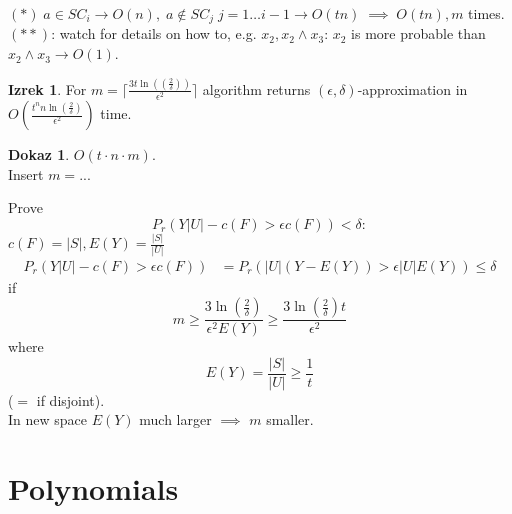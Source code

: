 \documentclass[a4paper, 12pt]{book}
\theoremstyle{definition}
\newtheorem{theorem}[counter]{Izrek}
\newtheorem{pro}[counter]{Dokaz}
\theoremstyle{remark}
\begin{document}
$(*) \; a \in SC_i \to O(n), \; a \notin SC_j \; j = 1 \dots i-1 \to O(tn) \; \implies \; O(tn), m$ times. \\
$(**)$: watch for details on how to, e.g. $x_2, x_2 \land x_3$: $x_2$ is more probable than $x_2 \land x_3 \to O(1)$.
\begin{theorem}
  For $m = \lceil\frac{3t \ln(\left(\frac{2}{\delta}\right))}{\epsilon^2}\rceil$ algorithm returns $(\epsilon,\delta)$-approximation
  in $O\left(\frac{t^n n \ln\left(\frac{2}{\delta}\right)}{\epsilon^2}\right)$ time.
\end{theorem} 
\begin{pro}
  $O(t \cdot n \cdot m)$. \\
  Insert $m = ...$
\end{pro}
Prove
\begin{equation*}
  P_r(Y|U| - c(F) > \epsilon c(F)) < \delta:
\end{equation*}
$c(F) = |S|, E(Y) = \frac{|S|}{|U|}$
\begin{align*}
  P_r(Y|U| - c(F) > \epsilon c(F)) &= P_r(|U|(Y - E(Y)) > \epsilon |U| E(Y)) \leq \delta
\end{align*}
if
\begin{equation*}
  m \geq \frac{3 \ln\left(\frac{2}{\delta}\right)}{\epsilon^2 E(Y)} \geq \frac{3 \ln\left(\frac{2}{\delta}\right)t}{\epsilon^2}
\end{equation*}
where
\begin{equation*}
  E(Y) = \frac{|S|}{|U|} \geq \frac{1}{t}
\end{equation*}
($=$ if disjoint). \\
In new space $E(Y)$ much larger $\implies$ $m$ smaller.



\chapter{Polynomials}
\end{document}
